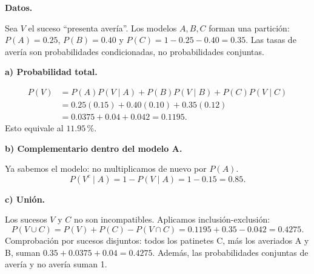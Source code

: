 \textbf{Datos.}\par\nopagebreak[4]
Sea $V$ el suceso ``presenta avería''. Los modelos $A,B,C$ forman una partición: $P(A)=0.25$, $P(B)=0.40$ y $P(C)=1-0.25-0.40=0.35$. Las tasas de avería son probabilidades condicionadas, no probabilidades conjuntas.

\textbf{a) Probabilidad total.}\par\nopagebreak[4]
\[
\begin{aligned}
P(V)&=P(A)P(V\mid A)+P(B)P(V\mid B)+P(C)P(V\mid C)\\
&=0.25(0.15)+0.40(0.10)+0.35(0.12)\\
&=0.0375+0.04+0.042=\boxed{0.1195}.
\end{aligned}
\]
Esto equivale al $11.95$\,\%.

\textbf{b) Complementario dentro del modelo A.}\par\nopagebreak[4]
Ya sabemos el modelo: no multiplicamos de nuevo por $P(A)$.
\[
P(V^c\mid A)=1-P(V\mid A)=1-0.15=\boxed{0.85}.
\]

\textbf{c) Unión.}\par\nopagebreak[4]
Los sucesos $V$ y $C$ no son incompatibles. Aplicamos inclusión-exclusión:
\[
P(V\cup C)=P(V)+P(C)-P(V\cap C)
=0.1195+0.35-0.042=\boxed{0.4275}.
\]
Comprobación por sucesos disjuntos: todos los patinetes C, más los averiados A y B, suman $0.35+0.0375+0.04=0.4275$. Además, las probabilidades conjuntas de avería y no avería suman 1.
